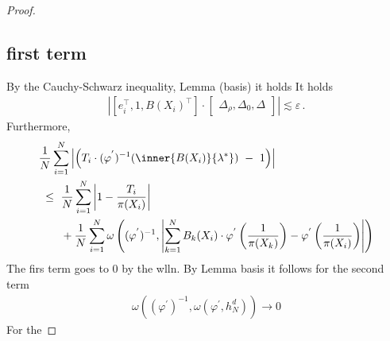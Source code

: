 \begin{proof}
\subsection*{first term}
By the Cauchy-Schwarz inequality, Lemma (basis) it holds
It holds
\begin{align*}
  \left|
   \left[ 
    e_i^\top,1,B(X_i)^\top
  \right]
  \cdot
  \begin{bmatrix}
    \Delta_\rho,\Delta_0,\Delta
    \end{bmatrix}
  \right|
  \lesssim
  \varepsilon
  \,.
\end{align*}
Furthermore,
\begin{align*}
  &
    \frac{1}{N}
\sum_{i=1} 
  ^N
  \left|
   \left( 
     T_i\cdot
  (
  \varphi^{'}
  )
  ^{-1}
  \!
  \left( 
\inner
{B(X_i)}
{
\lambda^*
}
  \right)
  \ 
  -
  \ 
  1
  \right)
  \right|
  \\
  &
  \ 
  \le
  \ 
    \frac{1}{N}
\sum_{i=1} 
^{N}
\left|
  1-
  \frac
  {T_i}
  {\pi(X_i)}
\right|
\\
&
\qquad
+
    \frac{1}{N}
    \sum_{i=1}^{N} 
\omega
\left(
  (
  \varphi^{'}
  )
  ^{-1}
  ,
  \left|
    \sum_{k=1}^{N}
  B_k(X_i)
  \cdot
  \varphi^{'}
  \left(
    \frac
    {1}
    {\pi(X_k)}
  \right)
  -
  \varphi^{'}
  \left(
    \frac
    {1}
    {\pi(X_i)}
  \right)
  \right|
  \right)
\end{align*}
The firs term goes to 0 by the wlln.
By Lemma basis it follows for the second term
\begin{align*}
\omega
\left(
  (
  \varphi^{'}
  )
  ^{-1}
  ,
  \omega(
  \varphi^{'}
  ,
  h_N^d
  )
  \right)
  \to 0
\end{align*}
For the 
 \end{proof}

